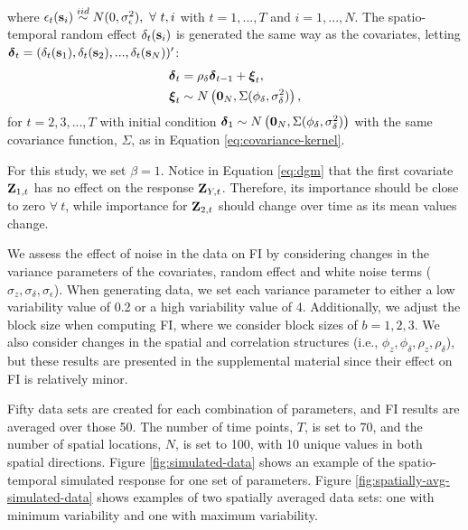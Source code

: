 \documentclass[AMS,STIX2COL]{WileyNJD-v2}
\begin{document}
where $\epsilon_t({\bf s}_i) \overset{iid}{\sim}  N(0,\sigma_{\epsilon}^2),\ \forall \ t,i$ with $t=1,...,T$ and $i=1,...,N$. The spatio-temporal random effect $\delta_t({\bf s}_i)$ is generated the same way as the covariates, letting $\boldsymbol{\delta}_t = (\delta_{t}({\bf s}_1),\delta_{t}({\bf s}_2),...,\delta_{t}({\bf s}_N))'$:
\begin{align}
    \boldsymbol{\delta}_{t} &= \rho_{\delta} \boldsymbol{\delta}_{t-1} + \boldsymbol{\xi}_{t},\\
    \boldsymbol{\xi}_{t} &\sim N \left({\bf 0}_N, \Sigma(\phi_{\delta},\sigma^2_{\delta})\right),
\end{align}
for $t=2,3,...,T$ with initial condition $\boldsymbol{\delta}_{1} \sim N \left({\bf 0}_N,\Sigma(\phi_{\delta},\sigma^2_{\delta})\right)$ with the same covariance function, $\Sigma$, as in Equation \eqref{eq:covariance-kernel}. 

For this study, we set $\beta=1$. Notice in Equation \eqref{eq:dgm} that the first covariate ${\bf Z}_{1,t}$ has no effect on the response ${\bf Z}_{Y,t}$. Therefore, its importance should be close to zero $\forall \ t$, while importance for ${\bf Z}_{2,t}$ should change over time as its mean values change.

We assess the effect of noise in the data on FI by considering changes in the variance parameters of the covariates, random effect and white noise terms ($\sigma_z,\sigma_{\delta},\sigma_{\epsilon}$). When generating data, we set each variance parameter to either a low variability value of 0.2 or a high variability value of 4. Additionally, we adjust the block size when computing FI, where we consider block sizes of $b=1,2,3$. We also consider changes in the spatial and correlation structures (i.e., $\phi_{z},\phi_{\delta},\rho_{z},\rho_{\delta}$), but these results are presented in the supplemental material since their effect on FI is relatively minor. 

Fifty data sets are created for each combination of parameters, and FI results are averaged over those 50. The number of time points, $T$, is set to 70, and the number of spatial locations, $N$, is set to 100, with 10 unique values in both spatial directions. Figure \ref{fig:simulated-data} shows an example of the spatio-temporal simulated response for one set of parameters. Figure \ref{fig:spatially-avg-simulated-data} shows examples of two spatially averaged data sets: one with minimum variability and one with maximum variability.  
\end{document}
